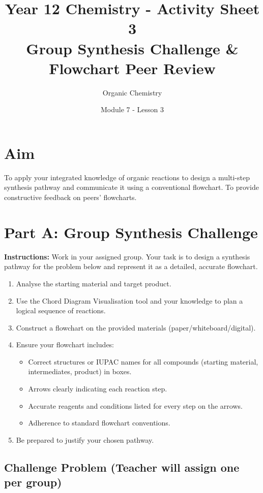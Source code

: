 \documentclass[11pt, a4paper]{article}
\title{Year 12 Chemistry - Activity Sheet 3 \\ Group Synthesis Challenge \& Flowchart Peer Review}
\date{Module 7 - Lesson 3}
\author{Organic Chemistry}
\begin{document}
\maketitle

\section*{Aim}
To apply your integrated knowledge of organic reactions to design a multi-step synthesis pathway and communicate it using a conventional flowchart. To provide constructive feedback on peers' flowcharts.

\section*{Part A: Group Synthesis Challenge}

\textbf{Instructions:}
Work in your assigned group. Your task is to design a synthesis pathway for the problem below and represent it as a detailed, accurate flowchart.
\begin{enumerate}
    \item Analyse the starting material and target product.
    \item Use the Chord Diagram Visualisation tool and your knowledge to plan a logical sequence of reactions.
    \item Construct a flowchart on the provided materials (paper/whiteboard/digital).
    \item Ensure your flowchart includes:
        \begin{itemize}
            \item Correct structures or IUPAC names for all compounds (starting material, intermediates, product) in boxes.
            \item Arrows clearly indicating each reaction step.
            \item Accurate reagents and conditions listed for every step on the arrows.
            \item Adherence to standard flowchart conventions.
        \end{itemize}
    \item Be prepared to justify your chosen pathway.
\end{enumerate}

\subsection*{Challenge Problem (Teacher will assign one per group)}
\end{document}
